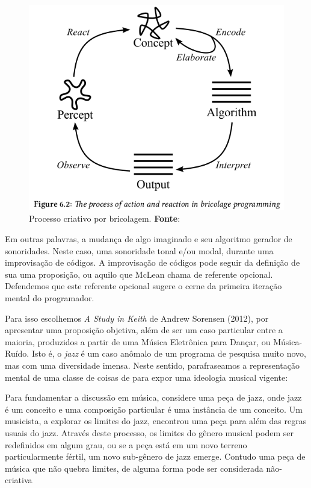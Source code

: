 \begin{figure}[!h]
  \centering
  \includegraphics[scale=0.5]{./imagens/processo_criativo.png}
  \caption{Processo criativo por bricolagem. \textbf{Fonte}: \cite[p.~122]{McLean2011}}
  \label{fig:bricolagem}
\end{figure}

Em outras palavras, a mudança de algo imaginado e seu algoritmo gerador de sonoridades. Neste caso, uma sonoridade tonal e/ou modal, durante uma improvisação de códigos. A improvisação de códigos pode seguir da definição de sua uma proposição, ou aquilo que McLean chama de referente opcional. Defendemos que este referente opcional sugere o cerne da primeira iteração mental do programador.

Para isso escolhemos \emph{A Study in Keith} de Andrew Sorensen (2012), por apresentar uma proposição objetiva, além de ser um caso particular entre a maioria, produzidos a partir de uma Música Eletrônica para Dançar, ou Música-Ruído. Isto é, o \emph{jazz} é um caso anômalo de um programa de pesquisa muito novo, mas com uma diversidade imensa. Neste sentido, parafraseamos a representação mental de uma classe de coisas de  para expor uma ideologia musical vigente:

\begin{citacao}
Para fundamentar a discussão em música, considere uma peça de jazz, onde jazz é um conceito e uma composição particular é uma instância de um conceito. Um musicista, a explorar os limites do jazz, encontrou uma peça para além das regras usuais do jazz. Através deste processo, os limites do gênero musical podem ser redefinidos em algum grau, ou se a peça está em um novo terreno particularmente fértil, um novo sub-gênero de jazz emerge. Contudo uma peça de música que não quebra limites, de alguma forma pode ser considerada não-criativa 
\end{citacao}

